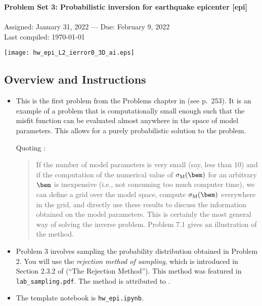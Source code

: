 \documentclass[11pt,titlepage,fleqn]{article}
\begin{document}

\begin{spacing}{1.2}
\centering
{\large \bf Problem Set 3: Probabilistic inversion for earthquake epicenter [epi]} \\
\cltag\ \\
Assigned: January 31, 2022 --- Due: February 9, 2022 \\
Last compiled: \today
\end{spacing}

\texttt{[image: hw\_epi\_L2\_ierror0\_3D\_ai.eps]}


\subsection*{Overview and Instructions}

\begin{itemize}
\item This is the first problem from the Problems chapter in \citet{Tarantola2005} (see p.~253). It is an example of a problem that is computationally small enough such that the misfit function can be evaluated almost anywhere in the space of model parameters. This allows for a purely probabilistic solution to the problem.

Quoting \citet[][p.~38]{Tarantola2005}:
\begin{quote}
If the number of model parameters is very small (say, less than 10) and if the computation of the numerical value of $\sigma_{\rm M}(\bem)$ for an arbitrary $\bem$ is inexpensive (i.e., not consuming too much computer time), we can define a grid over the model space, compute $\sigma_{\rm M}(\bem)$ everywhere in the grid, and directly use these results to discuss the information obtained on the model parameters. This is certainly the most general way of solving the inverse problem. Problem 7.1 gives an illustration of the method.
\end{quote}

\item Problem 3 involves sampling the probability distribution obtained in Problem 2. You will use the {\em rejection method of sampling}, which is introduced in Section 2.3.2 of \citet{Tarantola2005} (``The Rejection Method''). This method was featured in \verb+lab_sampling.pdf+. The method is attributed to \citet{vonNeumann1951}.

\item The template notebook is \verb+hw_epi.ipynb+.
%
\end{itemize}
\end{document}
